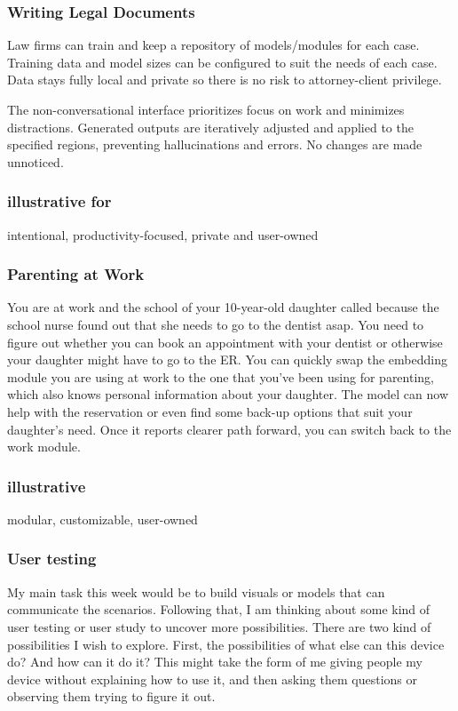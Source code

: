 \documentclass[12pt]{article}
\begin{document}
\subsubsection*{Writing Legal Documents}
Law firms can train and keep a repository of models/modules for each case. Training data and model sizes can be configured to suit the needs of each case. Data stays fully local and private so there is no risk to attorney-client privilege.

The non-conversational interface prioritizes focus on work and minimizes distractions. Generated outputs are iteratively adjusted and applied to the specified regions, preventing hallucinations and errors. No changes are made unnoticed.

\subsubsection*{illustrative for}
intentional, productivity-focused, private and user-owned

\subsubsection*{Parenting at Work}
You are at work and the school of your 10-year-old daughter called because the school nurse found out that she needs to go to the dentist asap. You need to figure out whether you can book an appointment with your dentist or otherwise your daughter might have to go to the ER. You can quickly swap the embedding module you are using at work to the one that you've been using for parenting, which also knows personal information about your daughter. The model can now help with the reservation or even find some back-up options that suit your daughter's need. Once it reports clearer path forward, you can switch back to the work module.

\subsubsection*{illustrative}
modular, customizable, user-owned

\subsubsection*{User testing}

My main task this week would be to build visuals or models that can communicate the scenarios. Following that, I am thinking about some kind of user testing or user study to uncover more possibilities. There are two kind of possibilities I wish to explore. First, the possibilities of what else can this device do? And how can it do it? This might take the form of me giving people my device without explaining how to use it, and then asking them questions or observing them trying to figure it out.
\end{document}
